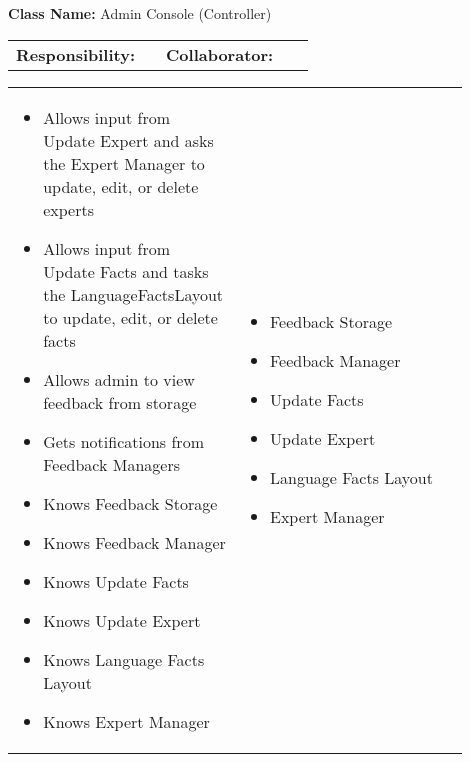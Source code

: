 \begin{red_cards}[]
    \textbf{Class Name:} Admin Console (Controller)
    \tcbline
    \begin{tabular}{p{0.45\linewidth} | p{0.45\linewidth}}
        \textbf{Responsibility:}& 
        \textbf{Collaborator:}\\
    \end{tabular}
    \tcbline
    \begin{tabular}{p{0.45\linewidth} | p{0.45\linewidth}}
        \begin{itemize}

            \item Allows input from Update Expert and asks the Expert Manager to update, edit, or delete experts
            \item Allows input from Update Facts and tasks the LanguageFactsLayout to update, edit, or delete facts
            \item Allows admin to view feedback from storage
            \item Gets notifications from Feedback Managers
            \item Knows Feedback Storage
            \item Knows Feedback Manager
            \item Knows Update Facts
            \item Knows Update Expert
            \item Knows Language Facts Layout
            \item Knows Expert Manager
        \end{itemize}
        &
        \begin{itemize}
            \item Feedback Storage
            \item Feedback Manager
            \item Update Facts
            \item Update Expert
            \item Language Facts Layout
            \item Expert Manager
        \end{itemize}
    \end{tabular}
\end{red_cards}